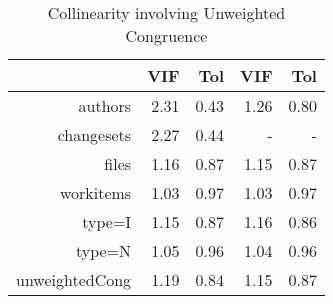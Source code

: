 \begin{table}[ht]
\begin{center}
\begin{tabular}{rrrrr}
  \hline
 & VIF & Tol & VIF & Tol \\ 
  \hline
authors & 2.31 & 0.43 & 1.26 & 0.80 \\ 
  changesets & 2.27 & 0.44 & - & - \\ 
  files & 1.16 & 0.87 & 1.15 & 0.87 \\ 
  workitems & 1.03 & 0.97 & 1.03 & 0.97 \\ 
  type=I & 1.15 & 0.87 & 1.16 & 0.86 \\ 
  type=N & 1.05 & 0.96 & 1.04 & 0.96 \\ 
  unweightedCong & 1.19 & 0.84 & 1.15 & 0.87 \\ 
   \hline
\end{tabular}
\caption{Collinearity involving Unweighted Congruence}
\label{tab:vif-unweighted}
\end{center}
\end{table}
